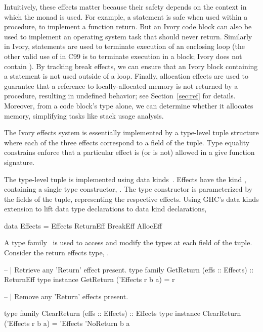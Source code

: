 Intuitively, these effects matter because their safety depends on the context in
which the monad is used. For example, a  statement is safe when used
within a procedure, to implement a function return. But an Ivory code block can
also be used to implement an operating system task that should never
return. Similarly in Ivory,  statements are used to terminate
execution of an enclosing loop (the other valid use of  in C99 is to
terminate execution in a  block; Ivory does not contain
). By tracking break effects, we can ensure that an Ivory block
containing a  statement is not used outside of a loop. Finally,
allocation effects are used to guarantee that a reference to locally-allocated
memory is not returned by a procedure, resulting in undefined behavior; see
Section~\ref{sec:ref} for details. Moreover, from a code block's type alone, we
can determine whether it allocates memory, simplifying tasks like stack usage
analysis.

The Ivory effects system is essentially implemented by a type-level tuple
structure where each of the three effects correspond to a field of the
tuple. Type equality constrains enforce that a particular effect is (or is not)
allowed in a give function signature.

The type-level tuple is implemented using data kinds~\cite{}. Effects have the
kind , containing a single type constructor, . The type
constructor  is parameterized by the fields of the tuple,
representing the respective effects. Using GHC's data kinds extension to lift
data type declarations to data kind declarations,
\begin{code}
data Effects = Effects ReturnEff BreakEff AllocEff
\end{code}

A type family~\cite{} is used to access and modify the types at each field of
the tuple. Consider the return effects type, .


\begin{code}
-- | Retrieve any 'Return' effect present.
type family   GetReturn (effs :: Effects) :: ReturnEff
type instance GetReturn ('Effects r b a) = r
\end{code}

-- | Remove any 'Return' effects present.
\begin{code}
type family   ClearReturn (effs :: Effects) :: Effects
type instance ClearReturn ('Effects r b a) = 'Effects 'NoReturn b a
\end{code}


